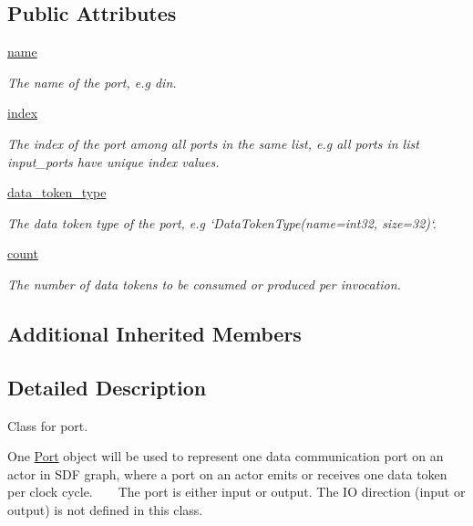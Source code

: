 \subsection*{Public Attributes}
\begin{DoxyCompactItemize}
\item 
\hyperlink{classsylva_1_1base_1_1sdf_1_1_port_aa8aa0ac5a7e375e2c0cb6e92a0b1dd20}{name}
\begin{DoxyCompactList}\small\item\em The name of the port, e.\+g {\ttfamily din}. \end{DoxyCompactList}\item 
\hyperlink{classsylva_1_1base_1_1sdf_1_1_port_abbfd66f762649b6a8105657259471c5a}{index}
\begin{DoxyCompactList}\small\item\em The index of the port among all ports in the same list, e.\+g all ports in list {\ttfamily input\+\_\+ports} have unique index values. \end{DoxyCompactList}\item 
\hyperlink{classsylva_1_1base_1_1sdf_1_1_port_ac0ca6b47887a32c69c66564f683adf2b}{data\+\_\+token\+\_\+type}
\begin{DoxyCompactList}\small\item\em The data token type of the port, e.\+g `\+Data\+Token\+Type(name=\textquotesingle{}int32\textquotesingle{}, size=32)`. \end{DoxyCompactList}\item 
\hyperlink{classsylva_1_1base_1_1sdf_1_1_port_aec009757acfd92df95b273c671cac068}{count}
\begin{DoxyCompactList}\small\item\em The number of data tokens to be consumed or produced per invocation. \end{DoxyCompactList}\end{DoxyCompactItemize}
\subsection*{Additional Inherited Members}


\subsection{Detailed Description}
Class for port. 

One \hyperlink{classsylva_1_1base_1_1sdf_1_1_port}{Port} object will be used to represent one data communication port on an actor in S\+DF graph, where a port on an actor emits or receives one data token per clock cycle. ~\newline
~\newline
 The port is either input or output. The IO direction (input or output) is not defined in this class.


